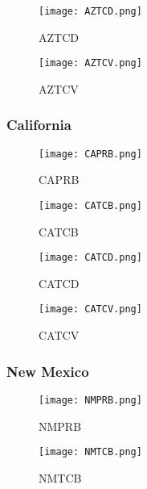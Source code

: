 \documentclass{mcmthesis}
\begin{document}
\begin{figure}[H]
\begin{minipage}[htb]{0.5\textwidth}
\centering
\texttt{[image: AZTCD.png]}
\caption{AZTCD} \label{fig:AZTCD}
\end{minipage}
\begin{minipage}[htb]{0.5\textwidth}
\centering
\texttt{[image: AZTCV.png]}
\caption{AZTCV} \label{fig:AZTCV}
\end{minipage}
\end{figure}


\subsubsection{California}
\begin{figure}[H]
\begin{minipage}[htb]{0.5\textwidth}
\centering
\texttt{[image: CAPRB.png]}
\caption{CAPRB} \label{fig:CAPRB}
\end{minipage}
\begin{minipage}[htb]{0.5\textwidth}
\centering
\texttt{[image: CATCB.png]}
\caption{CATCB} \label{fig:CATCB}
\end{minipage}
\end{figure}

\begin{figure}[H]
\begin{minipage}[htb]{0.5\textwidth}
\centering
\texttt{[image: CATCD.png]}
\caption{CATCD} \label{fig:CATCD}
\end{minipage}
\begin{minipage}[htb]{0.5\textwidth}
\centering
\texttt{[image: CATCV.png]}
\caption{CATCV} \label{fig:CATCV}
\end{minipage}
\end{figure}

\subsubsection{New Mexico}
\begin{figure}[H]
\begin{minipage}[htb]{0.5\textwidth}
\centering
\texttt{[image: NMPRB.png]}
\caption{NMPRB} \label{fig:NMPRB}
\end{minipage}
\begin{minipage}[htb]{0.5\textwidth}
\centering
\texttt{[image: NMTCB.png]}
\caption{NMTCB} \label{fig:NMTCB}
\end{minipage}
\end{figure}
\end{document}
